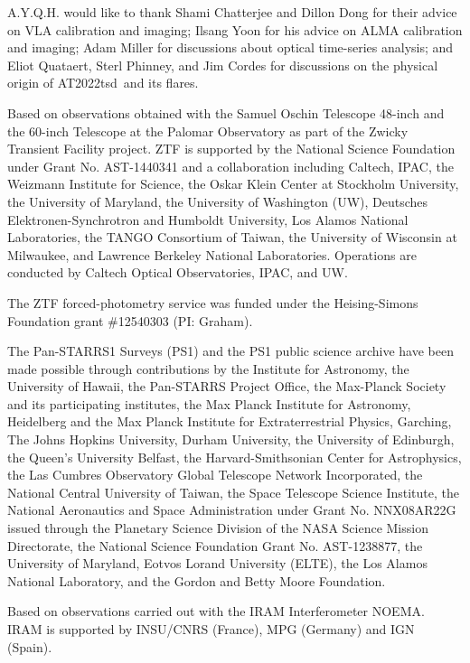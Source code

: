 \documentclass{nature_plusfigure}
\newcommand{\at}{AT2022tsd}
\begin{document}
\begin{addendum}

\item  A.Y.Q.H. would like to thank Shami Chatterjee and Dillon Dong for their advice on VLA calibration and imaging; Ilsang Yoon for his advice on ALMA calibration and imaging; Adam Miller for discussions about optical time-series analysis; and Eliot Quataert, Sterl Phinney, and Jim Cordes for discussions on the physical origin of \at\ and its flares.

Based on observations obtained with the Samuel Oschin Telescope 48-inch and the 60-inch Telescope at the Palomar Observatory as part of the Zwicky Transient Facility project. ZTF is supported by the National Science Foundation under Grant No. AST-1440341 and a collaboration including Caltech, IPAC, the Weizmann Institute for Science, the Oskar Klein Center at Stockholm University, the University of Maryland, the University of Washington (UW), Deutsches Elektronen-Synchrotron and Humboldt University, Los Alamos National Laboratories, the TANGO Consortium of Taiwan, the University of Wisconsin at Milwaukee, and Lawrence Berkeley National Laboratories. Operations are conducted by Caltech Optical Observatories, IPAC, and UW.  

The ZTF forced-photometry service was funded under the Heising-Simons Foundation grant \#12540303 (PI: Graham).

The Pan-STARRS1 Surveys (PS1) and the PS1 public science archive have been made possible through contributions by the Institute for Astronomy, the University of Hawaii, the Pan-STARRS Project Office, the Max-Planck Society and its participating institutes, the Max Planck Institute for Astronomy, Heidelberg and the Max Planck Institute for Extraterrestrial Physics, Garching, The Johns Hopkins University, Durham University, the University of Edinburgh, the Queen's University Belfast, the Harvard-Smithsonian Center for Astrophysics, the Las Cumbres Observatory Global Telescope Network Incorporated, the National Central University of Taiwan, the Space Telescope Science Institute, the National Aeronautics and Space Administration under Grant No. NNX08AR22G issued through the Planetary Science Division of the NASA Science Mission Directorate, the National Science Foundation Grant No. AST-1238877, the University of Maryland, Eotvos Lorand University (ELTE), the Los Alamos National Laboratory, and the Gordon and Betty Moore Foundation.

Based on observations carried out with the IRAM Interferometer NOEMA. IRAM is supported by INSU/CNRS (France), MPG (Germany) and IGN (Spain).


\end{addendum}
\end{document}
